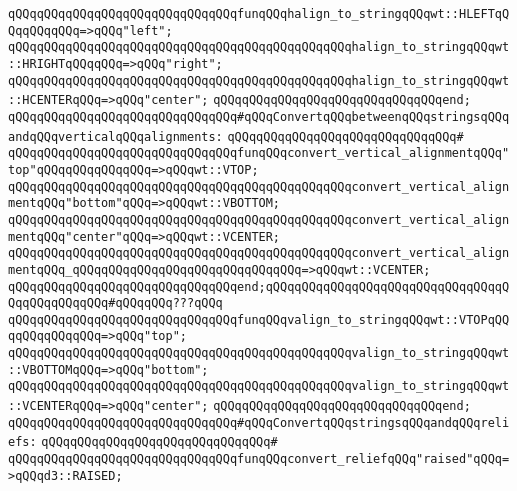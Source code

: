 \verb|qQQqqQQqqQQqqQQqqQQqqQQqqQQqqQQqfunqQQqhalign_to_stringqQQqwt::HLEFTqQQqqQQqqQQq=>qQQq"left";|\newline
\verb|qQQqqQQqqQQqqQQqqQQqqQQqqQQqqQQqqQQqqQQqqQQqqQQqhalign_to_stringqQQqwt::HRIGHTqQQqqQQq=>qQQq"right";|\newline
\verb|qQQqqQQqqQQqqQQqqQQqqQQqqQQqqQQqqQQqqQQqqQQqqQQqhalign_to_stringqQQqwt::HCENTERqQQq=>qQQq"center";|\newline
\verb|qQQqqQQqqQQqqQQqqQQqqQQqqQQqqQQqend;|\newline
\newline
\verb|qQQqqQQqqQQqqQQqqQQqqQQqqQQqqQQq#qQQqConvertqQQqbetweenqQQqstringsqQQqandqQQqverticalqQQqalignments:|\newline
\verb|qQQqqQQqqQQqqQQqqQQqqQQqqQQqqQQq#|\newline
\verb|qQQqqQQqqQQqqQQqqQQqqQQqqQQqqQQqfunqQQqconvert_vertical_alignmentqQQq"top"qQQqqQQqqQQqqQQq=>qQQqwt::VTOP;|\newline
\verb|qQQqqQQqqQQqqQQqqQQqqQQqqQQqqQQqqQQqqQQqqQQqqQQqconvert_vertical_alignmentqQQq"bottom"qQQq=>qQQqwt::VBOTTOM;|\newline
\verb|qQQqqQQqqQQqqQQqqQQqqQQqqQQqqQQqqQQqqQQqqQQqqQQqconvert_vertical_alignmentqQQq"center"qQQq=>qQQqwt::VCENTER;|\newline
\verb|qQQqqQQqqQQqqQQqqQQqqQQqqQQqqQQqqQQqqQQqqQQqqQQqconvert_vertical_alignmentqQQq_qQQqqQQqqQQqqQQqqQQqqQQqqQQqqQQq=>qQQqwt::VCENTER;|\newline
\verb|qQQqqQQqqQQqqQQqqQQqqQQqqQQqqQQqend;qQQqqQQqqQQqqQQqqQQqqQQqqQQqqQQqqQQqqQQqqQQqqQQq#qQQqqQQq???qQQq|\newline
\newline
\verb|qQQqqQQqqQQqqQQqqQQqqQQqqQQqqQQqfunqQQqvalign_to_stringqQQqwt::VTOPqQQqqQQqqQQqqQQq=>qQQq"top";|\newline
\verb|qQQqqQQqqQQqqQQqqQQqqQQqqQQqqQQqqQQqqQQqqQQqqQQqvalign_to_stringqQQqwt::VBOTTOMqQQq=>qQQq"bottom";|\newline
\verb|qQQqqQQqqQQqqQQqqQQqqQQqqQQqqQQqqQQqqQQqqQQqqQQqvalign_to_stringqQQqwt::VCENTERqQQq=>qQQq"center";|\newline
\verb|qQQqqQQqqQQqqQQqqQQqqQQqqQQqqQQqend;|\newline
\newline
\verb|qQQqqQQqqQQqqQQqqQQqqQQqqQQqqQQq#qQQqConvertqQQqstringsqQQqandqQQqreliefs:|\newline
\verb|qQQqqQQqqQQqqQQqqQQqqQQqqQQqqQQq#|\newline
\verb|qQQqqQQqqQQqqQQqqQQqqQQqqQQqqQQqfunqQQqconvert_reliefqQQq"raised"qQQq=>qQQqd3::RAISED;|\newline
